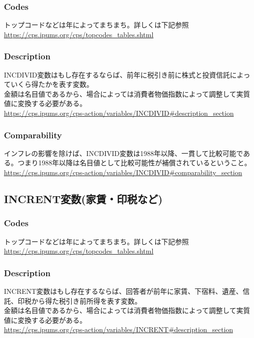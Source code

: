 \documentclass{jsarticle}
\begin{document}
\subsubsection{Codes}
トップコードなどは年によってまちまち。詳しくは下記参照\\
\url{https://cps.ipums.org/cps/topcodes_tables.shtml}

\subsubsection{Description}
INCDIVID変数はもし存在するならば、前年に税引き前に株式と投資信託によっていくら得たかを表す変数。\\
  
金額は名目値であるから、場合によっては消費者物価指数によって調整して実質値に変換する必要がある。\\
\url{https://cps.ipums.org/cps-action/variables/INCDIVID#description_section}

\subsubsection{Comparability}
インフレの影響を除けば、INCDIVID変数は1988年以降、一貫して比較可能である。つまり1988年以降は名目値として比較可能性が補償されているということ。\\
\url{https://cps.ipums.org/cps-action/variables/INCDIVID#comparability_section}

\subsection{INCRENT変数(家賃・印税など)}

\subsubsection{Codes}
トップコードなどは年によってまちまち。詳しくは下記参照\\
\url{https://cps.ipums.org/cps/topcodes_tables.shtml}

\subsubsection{Description}
INCRENT変数はもし存在するならば、回答者が前年に家賃、下宿料、遺産、信託、印税から得た税引き前所得を表す変数。\\
  
金額は名目値であるから、場合によっては消費者物価指数によって調整して実質値に変換する必要がある。\\
\url{https://cps.ipums.org/cps-action/variables/INCRENT#description_section}
\end{document}

